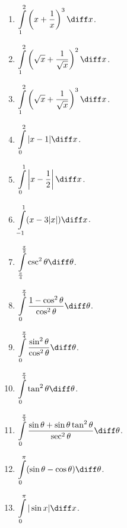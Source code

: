 \begin{multicols}{3}
\begin{enumerate}[ref={\fcProblemRef}]
\item $\displaystyle \int\limits_{1}^{2} \left(x + \frac{1}{x} \right)^3 \diff x$.

\item $\displaystyle \int\limits_{1}^{2} \left(\sqrt{x} + \frac{1}{\sqrt{x}} \right)^2 \diff x$.

\item $\displaystyle \int\limits_{1}^{2} \left(\sqrt{x} +\frac{1}{\sqrt{x}} \right)^3 \diff x$.

\item $\displaystyle \int\limits_{0}^{2}|x-1| \diff x$.

\item \label{problemIntegralAbsoluteValuexminushalf} $\displaystyle \int\limits_{0}^{1} \left|x-\frac{1}{2}\right| \diff x$.

\item $\displaystyle \int\limits_{-1}^{1}(x-3|x|) \diff x$.

\item $\displaystyle \int\limits_{\frac{\pi}{4}}^{\frac{\pi}{2}} \csc^2\theta \diff \theta$.

\answer{$\left[ \right]_{}^{}=$}
\item $\displaystyle \int\limits_{0}^{\frac{\pi}{4}}\frac{1-\cos^2\theta}{\cos^2\theta} \diff \theta$.

\answer{$\left[ \right]_{}^{}=$}
\item $\displaystyle \int\limits_{0}^{\frac{\pi}{4}}\frac{\sin^2\theta}{\cos^2\theta} \diff \theta$.

\answer{$\left[ \right]_{}^{}=$}
\item $\displaystyle \int\limits_{0}^{\frac{\pi}{4}}\tan^2\theta \diff \theta$.

\answer{$\left[ \right]_{}^{}=$}
\item $\displaystyle \int\limits_{0}^{\frac{\pi}{3}} \frac{\sin \theta +\sin \theta \tan^2\theta}{\sec^2\theta} \diff \theta$.

\answer{$\left[ \right]_{}^{}=$}
\item $\displaystyle \int\limits_{0}^{\pi} (\sin \theta -\cos \theta) \diff \theta$.

\answer{$\left[ \right]_{}^{}=$}
\item $\displaystyle \int\limits_{0}^{\pi}|\sin x| \diff x$.
\end{enumerate}
\end{multicols}
